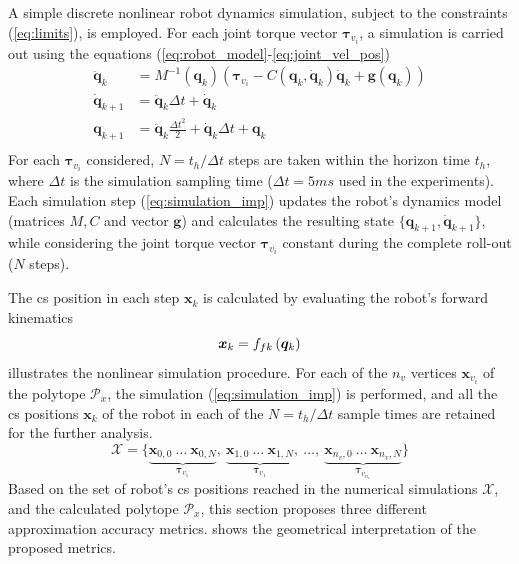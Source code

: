 A simple discrete nonlinear robot dynamics simulation, subject to the constraints (\ref{eq:limits}), is employed. For each joint torque vector $\bm{\tau}_{v_i}$, a simulation is carried out using the equations  (\ref{eq:robot_model}-\ref{eq:joint_vel_pos}) 
\begin{equation}
\begin{split}
    \ddot{\bm{q}}_{k} &= M^{-1}(\bm{q}_k)\left(\bm{\tau}_{v_i} - C(\bm{q}_k,\dot{\bm{q}}_k)\dot{\bm{q}}_k + \bm{g}(\bm{q}_k)\right)\\
    \dot{\bm{q}}_{k+1} &= \ddot{\bm{q}}_k\Delta t + \dot{\bm{q}}_{k}\\
    \bm{q}_{k+1} &= \ddot{\bm{q}}_k\frac{\Delta t^2}{2} + \dot{\bm{q}}_k\Delta t  + \bm{q}_{k}\\
\end{split}
\label{eq:simulation_imp}
\end{equation}
For each $\bm{\tau}_{v_i}$ considered, $N=t_h/\Delta t$ steps are taken within the horizon time $t_h$, where $\Delta t$ is the simulation sampling time ($\Delta t = 5ms$ used in the experiments). Each simulation step (\ref{eq:simulation_imp}) updates the robot's dynamics model (matrices $M,C$ and vector $\bm{g}$) and calculates the resulting state $\{{\bm{q}}_{k+1},\dot{\bm{q}}_{k+1}\}$, while considering the joint torque vector $\bm{\tau}_{v_i}$ constant during the complete roll-out ($N$ steps). 

The \gls{cs} position in each step $\bm{x}_{k}$ is calculated by evaluating the  robot's forward kinematics
\begin{equation}
    \bm{x}_{k} =f_{fk}\left(\bm{q}_{k}\right)
\end{equation}
 illustrates the nonlinear simulation procedure. For each of the $n_v$ vertices $\bm{x}_{v_i}$ of the polytope $\mathcal{P}_x$, the simulation (\ref{eq:simulation_imp}) is performed, and all the \gls{cs} positions $\bm{x}_k$ of the robot in each of the $N=t_h/\Delta t$ sample times are retained for the further analysis. $$
\mathcal{X} = \{\underbrace{\bm{x}_{0,0}~\dots ~\bm{x}_{0,N}}_{\bm{\tau}_{v_1}},~\underbrace{\bm{x}_{1,0}~\dots~\bm{x}_{1,N}}_{\bm{\tau}_{v_1}},~\dots, ~ \underbrace{\bm{x}_{n_v,0}~\dots~\bm{x}_{n_v,N}}_{\bm{\tau}_{v_{n_v}}}\}
$$
Based on the set of robot's \gls{cs} positions reached in the numerical simulations $\mathcal{X}$, and the calculated polytope $\mathcal{P}_x$, this section proposes three different approximation accuracy metrics.  shows the geometrical interpretation of the proposed metrics.

